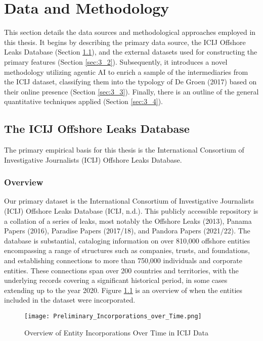 \chapter{Data and Methodology}
\label{chap:data_methodology}

This section details the data sources and methodological approaches employed in this thesis. It begins by describing the primary data source, the ICIJ Offshore Leaks Database (Section \ref{sec:3_1}), and the external datasets used for constructing the primary features (Section \ref{sec:3_2}). Subsequently, it introduces a novel methodology utilizing agentic AI to enrich a sample of the intermediaries from the ICIJ dataset, classifying them into the typology of De Groen (2017) based on their online presence (Section \ref{sec:3_3}). Finally, there is an outline of the general quantitative techniques applied (Section \ref{sec:3_4}).

\section{The ICIJ Offshore Leaks Database}
\label{sec:3_1}

The primary empirical basis for this thesis is the International Consortium of Investigative Journalists (ICIJ) Offshore Leaks Database. 

\subsection{Overview}

Our primary dataset is the International Consortium of Investigative Journalists (ICIJ) Offshore Leaks Database (ICIJ, n.d.). This publicly accessible repository is a collation of a series of leaks, most notably the Offshore Leaks (2013), Panama Papers (2016), Paradise Papers (2017/18), and Pandora Papers (2021/22). The database is substantial, cataloging information on over 810,000 offshore entities encompassing a range of structures such as companies, trusts, and foundations, and establishing connections to more than 750,000 individuals and corporate entities. These connections span over 200 countries and territories, with the underlying records covering a significant historical period, in some cases extending up to the year 2020. Figure \ref{fig:incorporations_time} is an overview of when the entities included in the dataset were incorporated.

\begin{figure}[htbp]
    \centering
    \texttt{[image: Preliminary\_Incorporations\_over\_Time.png]}
    \caption{Overview of Entity Incorporations Over Time in ICIJ Data}
    \label{fig:incorporations_time}
\end{figure}

